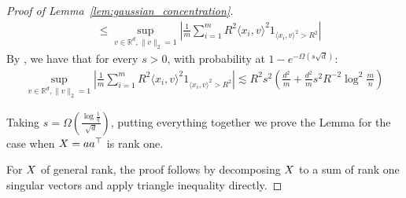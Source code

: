 \begin{proof}[Proof of Lemma~\ref{lem:gaussian_concentration}]
\begin{align}
 & \leq  \sup_{ v \in \mathbb{R}^d, \| v\|_2 = 1} \left| \frac{1}{m}\sum_{i = 1}^m R^2 \langle x_i , v \rangle^2   1_{\langle x_i,v  \rangle^2 > R^2 }  \right|\nonumber
\end{align}
By \cite[Theorem 3.6 and Remark 3.10]{adamczak2010quantitative}, we have that for every $s > 0$, with probability at $1 - e^{-\Omega(s \sqrt{d})}$:
\begin{align}
\sup_{ v \in \mathbb{R}^d, \| v\|_2 = 1} \left| \frac{1}{m}\sum_{i = 1}^m R^2 \langle x_i , v \rangle^2   1_{\langle x_i,v  \rangle^2 > R^2 }  \right| \lesssim R^2 s^2 \left( \frac{d^2}{m} + \frac{d^2}{m} s^2 R^{-2} \log^2 \frac{m}{n} \right)
\end{align}

Taking $s =\Omega\left( \frac{ \log \frac{1}{q}}{\sqrt{d}}\right)$, putting everything together we prove the Lemma for the case when ${X}=aa^\top$ is rank one. 

For ${X}$ of general rank, the proof follows by decomposing ${X}$ to a sum of rank one singular vectors and apply triangle inequality directly. 
\end{proof}
